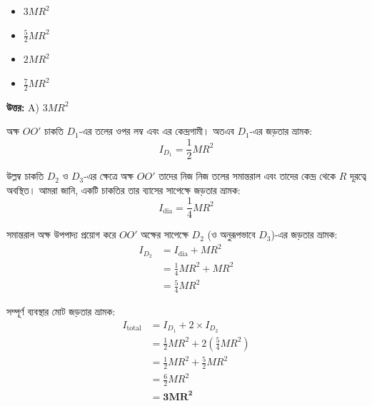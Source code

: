 \documentclass[12pt, a4paper]{article}
\begin{document}
\begin{itemize}[label={}, leftmargin=1cm, itemsep=0.5em]
    \item[\textbf{A)}]  $3 M R^2$
    \item[\textbf{B)}]  $\frac{5}{2} M R^2$
    \item[\textbf{C)}]  $2 M R^2$
    \item[\textbf{D)}]$\frac{7}{2} M R^2$
\end{itemize}

\vspace{0.5em}
\begin{tcolorbox}[answerbox]
    \textbf{\color{success} উত্তর:} A)  $3 M R^2$
\end{tcolorbox}
\vspace{1em}

\begin{tcolorbox}[solutionbox={সমাধান (Solution)}]
    \noindent
    অক্ষ $OO'$ চাকতি $D_1$-এর তলের ওপর লম্ব এবং এর কেন্দ্রগামী। 
    অতএব $D_1$-এর জড়তার ভ্রামক:
    \[ I_{D_1} = \frac{1}{2} M R^2 \]
    
    উল্লম্ব চাকতি $D_2$ ও $D_3$-এর ক্ষেত্রে অক্ষ $OO'$ তাদের নিজ নিজ তলের সমান্তরাল এবং তাদের কেন্দ্র থেকে $R$ দূরত্বে অবস্থিত।
    আমরা জানি, একটি চাকতির তার ব্যাসের সাপেক্ষে জড়তার ভ্রামক:
    \[ I_{\text{dia}} = \frac{1}{4} M R^2 \]
    
    সমান্তরাল অক্ষ উপপাদ্য প্রয়োগ করে $OO'$ অক্ষের সাপেক্ষে $D_2$ (ও অনুরূপভাবে $D_3$)-এর জড়তার ভ্রামক:
    \begin{align*}
        I_{D_2} &= I_{\text{dia}} + M R^2 \\
        &= \frac{1}{4} M R^2 + M R^2 \\
        &= \frac{5}{4} M R^2
    \end{align*}
    
    সম্পূর্ণ ব্যবস্থার মোট জড়তার ভ্রামক:
    \begin{align*}
        I_{\text{total}} &= I_{D_1} + 2 \times I_{D_2} \\
        &= \frac{1}{2} M R^2 + 2 \left(\frac{5}{4} M R^2\right) \\
        &= \frac{1}{2} M R^2 + \frac{5}{2} M R^2 \\
        &= \frac{6}{2} M R^2 \\
        &= \mathbf{3 M R^2}
    \end{align*}
\end{tcolorbox}
\end{document}
